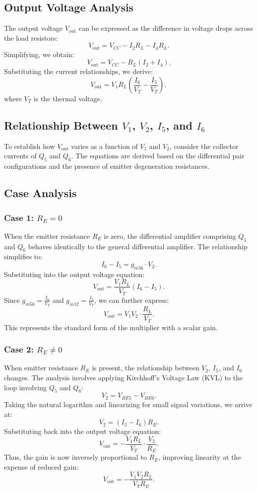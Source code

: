 \subsection{Output Voltage Analysis}
The output voltage $V_{\text{out}}$ can be expressed as the difference in voltage drops across the load resistors:
\[
V_{\text{out}} = V_{CC} - I_2 R_L - I_4 R_L.
\]
Simplifying, we obtain:
\[
V_{\text{out}} = V_{CC} - R_L (I_2 + I_4).
\]
Substituting the current relationships, we derive:
\[
V_{\text{out}} = V_1 R_L \left( \frac{I_6}{V_T} - \frac{I_5}{V_T} \right),
\]
where $V_T$ is the thermal voltage.

\subsection{Relationship Between $V_1$, $V_2$, $I_5$, and $I_6$}
To establish how $V_{\text{out}}$ varies as a function of $V_1$ and $V_2$, consider the collector currents of $Q_5$ and $Q_6$. The equations are derived based on the differential pair configurations and the presence of emitter degeneration resistances.

\subsection{Case Analysis}
\subsubsection{Case 1: $R_E = 0$}
When the emitter resistance $R_E$ is zero, the differential amplifier comprising $Q_5$ and $Q_6$ behaves identically to the general differential amplifier. The relationship simplifies to:
\[
I_6 - I_5 = g_{m56} \cdot V_2.
\]
Substituting into the output voltage equation:
\[
V_{\text{out}} = \frac{V_1 R_L}{V_T} (I_6 - I_5).
\]
Since $g_{m56} = \frac{I_6}{V_T}$ and $g_{m12} = \frac{I_5}{V_T}$, we can further express:
\[
V_{\text{out}} = V_1 V_2 \cdot \frac{R_L}{V_T}.
\]
This represents the standard form of the multiplier with a scalar gain.

\subsubsection{Case 2: $R_E \neq 0$}
When emitter resistance $R_E$ is present, the relationship between $V_2$, $I_5$, and $I_6$ changes. The analysis involves applying Kirchhoff's Voltage Law (KVL) to the loop involving $Q_5$ and $Q_6$:
\[
V_2 = V_{BE5} - V_{BE6}.
\]
Taking the natural logarithm and linearizing for small signal variations, we arrive at:
\[
V_2 = (I_5 - I_6) R_E.
\]
Substituting back into the output voltage equation:
\[
V_{\text{out}} = -\frac{V_1 R_L}{V_T} \cdot \frac{V_2}{R_E}.
\]
Thus, the gain is now inversely proportional to $R_E$, improving linearity at the expense of reduced gain:
\[
V_{\text{out}} = -\frac{V_1 V_2 R_L}{V_T R_E}.
\]

